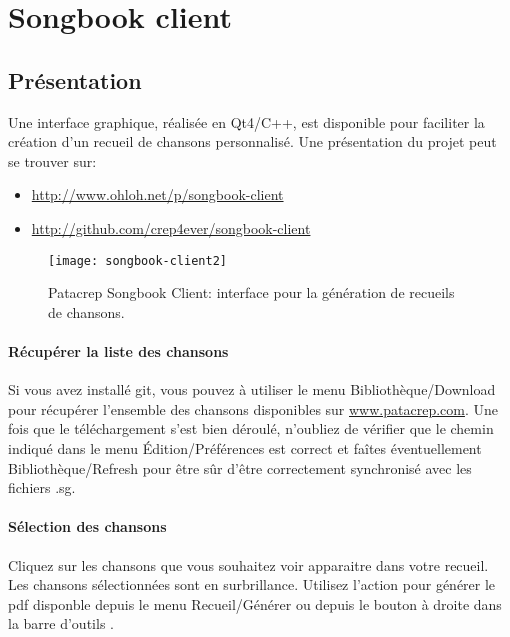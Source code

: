\documentclass[versionenligne]{patacrep}
\newcommand{\Touche}[1]{\Ovalbox{#1}}
\begin{document}
\section{Songbook client}

\subsection{Présentation}

Une interface graphique, réalisée en Qt4/C++, est disponible pour
faciliter la création d'un recueil de chansons personnalisé. Une
présentation du projet peut se trouver sur:
\begin{itemize}
\item \url{http://www.ohloh.net/p/songbook-client}
\item \url{http://github.com/crep4ever/songbook-client}
\end{itemize}

\begin{figure}[h]
  \centering
  \texttt{[image: songbook-client2]}
  \caption{Patacrep Songbook Client: interface pour la génération de
    recueils de chansons. }
  \label{fig:sb-client}
\end{figure}

\paragraph{Récupérer la liste des chansons}
Si vous avez installé git, vous pouvez à utiliser le menu
Bibliothèque/Download pour récupérer l'ensemble des chansons
disponibles sur \url{www.patacrep.com}. Une fois que le téléchargement
s'est bien déroulé, n'oubliez de vérifier que le chemin indiqué dans
le menu Édition/Préférences est correct et faîtes éventuellement
Bibliothèque/Refresh pour être sûr d'être correctement synchronisé
avec les fichiers .sg.

\paragraph{Sélection des chansons}
Cliquez sur les chansons que vous souhaitez voir apparaitre dans votre
recueil.  Les chansons sélectionnées sont en surbrillance. Utilisez
l'action \Touche{Générer PDF} pour générer le pdf disponble depuis le
menu Recueil/Générer ou depuis le bouton à droite dans la barre
d'outils .
\end{document}
